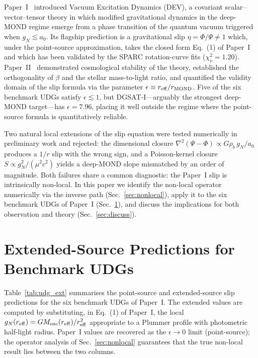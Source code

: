 \documentclass[aps,prd,twocolumn,superscriptaddress,nofootinbib]{revtex4-2}
\newcommand{\aO}{a_0}
\begin{document}
Paper~I~\cite{DEV1} introduced Vacuum Excitation Dynamics
(DEV), a covariant scalar--vector--tensor theory in which
modified gravitational dynamics in the deep-MOND regime
emerge from a phase transition of the quantum vacuum
triggered when $g_N \lesssim \aO$. Its flagship prediction
is a gravitational slip $\eta = \Phi/\Psi \neq 1$ which,
under the point-source approximation, takes the closed
form Eq.~(1) of Paper~I and which has been validated by
the SPARC rotation-curve fits ($\chi^2_\nu = 1.20$).
Paper~II~\cite{DEV2} demonstrated cosmological stability of
the theory, established the orthogonality of $\beta$ and
the stellar mass-to-light ratio, and quantified the
validity domain of the slip formula via the parameter
$\epsilon \equiv r_{\rm eff}/r_{\rm MOND}$. Five of the
six benchmark UDGs satisfy $\epsilon \lesssim 1$, but
DGSAT-I---arguably the strongest deep-MOND target---has
$\epsilon = 7.96$, placing it well outside the regime
where the point-source formula is quantitatively reliable.

Two natural local extensions of the slip equation were
tested numerically in preliminary work and rejected:
the dimensional closure
$\nabla^2(\Psi-\Phi) \propto G\rho_b\, g_N/\aO$ produces a
$1/r$ slip with the wrong sign, and a Poisson-kernel
closure $S\propto g_N^2/(\mu^2c^2)$ yields a deep-MOND
slope mismatched by an order of magnitude. Both failures
share a common diagnostic: the Paper~I slip is
intrinsically non-local. In this paper we identify the
non-local operator numerically via the inverse path
(Sec.~\ref{sec:nonlocal}), apply it to the six benchmark
UDGs of Paper~I (Sec.~\ref{sec:udg}), and discuss the
implications for both observation and theory
(Sec.~\ref{sec:discuss}).



\section{Extended-Source Predictions for Benchmark UDGs}
\label{sec:udg}

Table~\ref{tab:udg_ext} summarises the point-source and
extended-source slip predictions for the six benchmark
UDGs of Paper~I. The extended values are computed by
substituting, in Eq.~(1) of Paper~I, the local
$g_N(r_{\rm eff}) = G M_{\rm enc}(r_{\rm eff})/r_{\rm eff}^2$
appropriate to a Plummer profile with photometric
half-light radius. Paper~I values are recovered as the
$\epsilon \to 0$ limit (point-source); the operator
analysis of Sec.~\ref{sec:nonlocal} guarantees that the
true non-local result lies between the two columns.
\end{document}
